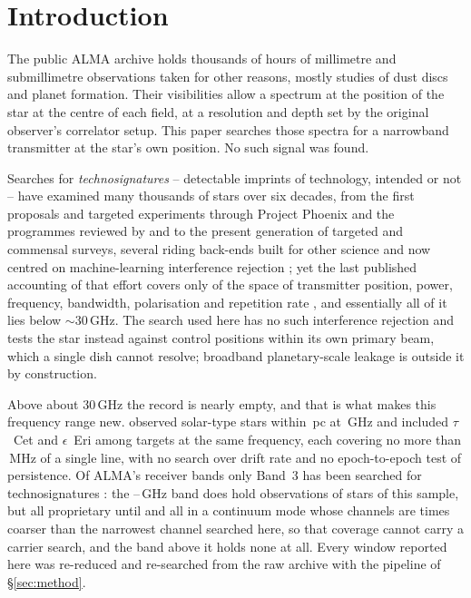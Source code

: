 \section{Introduction}
\label{sec:intro}

The public ALMA archive holds thousands of hours of millimetre and
submillimetre observations taken for other reasons, mostly studies of dust
discs and planet formation. Their visibilities allow a spectrum at the
position of the star at the centre of each field, at a resolution and depth
set by the original observer's correlator setup. This paper searches those
spectra for a narrowband transmitter at the star's own position. No such
signal was found.

Searches for \emph{technosignatures} -- detectable imprints of technology,
intended or not \citep{Sheikh2020,SETIreview2025} -- have examined many
thousands of stars over six decades, from the first proposals and targeted
experiments \citep{CocconiMorrison1959,Drake1960} through Project Phoenix and
the programmes reviewed by \citet{Tarter2001} and \citet{Backus2002} to the
present generation of targeted and commensal surveys, several riding back-ends
built for other science
\citep{Zhang2020,Czech2021,FAST3IATLAS2025,LOFARdualsite2023,Choza2024,Morrison2023,Tremblay2024,SRT2025}
and now centred on machine-learning interference rejection
\citep{Ma2023,GLOBULAR2025,AnomalyParkesGBT2025}; yet the last published
accounting of that effort covers only \HaystackFrac{} of the space of
transmitter position, power, frequency, bandwidth, polarisation and repetition
rate \citep{Wright2018}, and essentially all of it lies below
${\sim}30$\,GHz. The search used here has no such interference rejection and
tests the star instead against control positions within its own primary beam,
which a single dish cannot resolve; broadband planetary-scale leakage
\citep{BRaTs2026} is outside it by construction.

Above about 30\,GHz the record is nearly empty, and that is what makes this
frequency range new. \citet{Steffes1994} observed \SbPriorNStarA{} solar-type
stars within \SbPriorDistA\,pc at \SbPriorFreqGHz\,GHz and
\citet{Mauersberger1996} included $\tau$~Cet and $\epsilon$~Eri among
\SbPriorNStarB{} targets at the same frequency, each covering no more than
\SbPriorBandMHz\,MHz of a single line, with no search over drift rate and no
epoch-to-epoch test of persistence. Of ALMA's receiver bands only Band~3 has
been searched for technosignatures \citep{Mason2025}: the
\SbBandOneLoGHz--\SbBandOneHiGHz\,GHz band does hold observations of
\SbBoneNStar{} stars of this sample, but all proprietary until \SbBoneRelYear{}
and all in a continuum mode whose channels are \SbBoneChanRatio{} times coarser
than the narrowest channel searched here, so that coverage cannot carry a
carrier search, and the band above it holds none at all. Every window reported
here was re-reduced and re-searched from the raw archive with the pipeline of
\S\ref{sec:method}.


